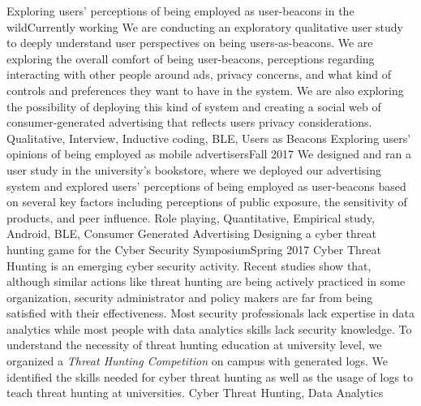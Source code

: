 %
%
%


\begin{projects}
	\project
	{Exploring users' perceptions of being employed as user-beacons in the wild}{Currently working}
	{We are conducting an exploratory qualitative user study to deeply understand user perspectives on being users-as-beacons. We are exploring the overall comfort of being user-beacons, perceptions regarding interacting with other people around ads, privacy concerns, and what kind of controls and preferences they want to have in the system. We are also exploring the possibility of deploying this kind of system and creating a social web of consumer-generated advertising that reflects users privacy considerations.}
	{}
	{Qualitative, Interview, Inductive coding, BLE, Users as Beacons}
	\project
	{Exploring users' opinions of being employed as mobile advertisers}{Fall 2017}
	{We designed and ran a user study in the university’s bookstore, where we deployed our advertising system and explored users’ perceptions of being employed as user-beacons based on several key factors including perceptions of public exposure, the sensitivity of products, and peer influence.}
	{}
	{Role playing, Quantitative, Empirical study, Android, BLE, Consumer Generated Advertising}
	\project
	{Designing a cyber threat hunting game for the Cyber Security Symposium}{Spring 2017}
	{Cyber Threat Hunting is an emerging cyber security activity. Recent studies show that, although similar actions like threat hunting are being actively practiced in some organization, security administrator and policy makers are far from being satisfied with their effectiveness. Most security professionals lack expertise in data analytics while most people with data analytics skills lack security knowledge. To understand the necessity of threat hunting education at university level, we organized a \textit{Threat Hunting Competition} on campus with generated logs. We identified the skills needed for cyber threat hunting as well as the usage of logs to teach threat hunting at universities.}
	{}
	{Cyber Threat Hunting, Data Analytics}
\end{projects}